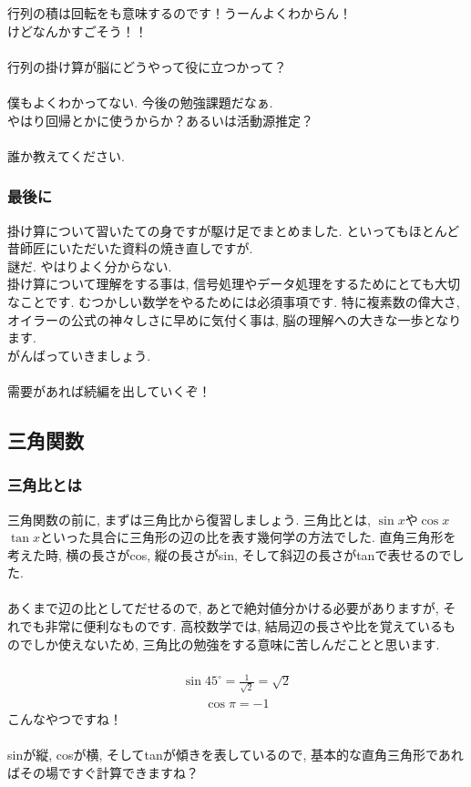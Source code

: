 \documentclass[11pt,a4paper]{jsarticle}
\begin{document}
行列の積は回転をも意味するのです！うーんよくわからん！\\
けどなんかすごそう！！\\
\\
行列の掛け算が脳にどうやって役に立つかって？\\
\\
僕もよくわかってない. 今後の勉強課題だなぁ.\\
やはり回帰とかに使うからか？あるいは活動源推定？\\
\\
誰か教えてください.\\
\subsubsection{最後に}
掛け算について習いたての身ですが駆け足でまとめました. といってもほとんど昔師匠にいただいた資料の焼き直しですが. \\
謎だ. やはりよく分からない.\\
掛け算について理解をする事は, 信号処理やデータ処理をするためにとても大切なことです. むつかしい数学をやるためには必須事項です. 特に複素数の偉大さ, オイラーの公式の神々しさに早めに気付く事は, 脳の理解への大きな一歩となります.\\
がんばっていきましょう.\\
\\
需要があれば続編を出していくぞ！\\

\subsection{三角関数}
\subsubsection{三角比とは}
三角関数の前に, まずは三角比から復習しましょう. 三角比とは, $\sin x$や$\cos x$ $\tan x$といった具合に三角形の辺の比を表す幾何学の方法でした. 直角三角形を考えた時, 横の長さがcos, 縦の長さがsin, そして斜辺の長さがtanで表せるのでした. \\
\\
あくまで辺の比としてだせるので, あとで絶対値分かける必要がありますが, それでも非常に便利なものです. 高校数学では, 結局辺の長さや比を覚えているものでしか使えないため, 三角比の勉強をする意味に苦しんだことと思います.\\
\\
\begin{eqnarray}
\sin 45^\circ = \frac{1}{\sqrt{2}} = \sqrt{2}
\end{eqnarray}
\begin{eqnarray}
\cos \pi = -1
\end{eqnarray}
こんなやつですね！\\
\\
sinが縦, cosが横, そしてtanが傾きを表しているので, 基本的な直角三角形であればその場ですぐ計算できますね？\\
\\
\end{document}
